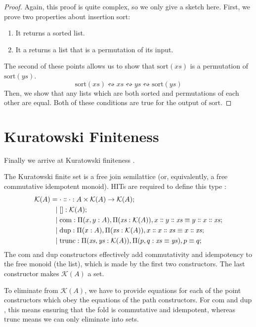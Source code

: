 \begin{proof}
  Again, this proof is quite complex, so we only give a sketch here.
  First, we prove two properties about insertion sort:
  \begin{enumerate}
    \item It returns a sorted list.
    \item It a returns a list that is a permutation of its input.
  \end{enumerate}
  The second of these points allows us to show that \(\text{sort}(\mathit{xs})\)
  is a permutation of \(\text{sort}(\mathit{ys})\).
  \begin{equation}
    \text{sort}(\mathit{xs}) \leftrightsquigarrow \mathit{xs} \leftrightsquigarrow \mathit{ys} \leftrightsquigarrow \text{sort}(\mathit{ys})
  \end{equation}
  Then, we show that any lists which are both sorted and permutations of each
  other are equal.
  Both of these conditions are true for the output of \(\text{sort}\).
\end{proof}
\section{Kuratowski Finiteness} \label{kuratowski}
Finally we arrive at Kuratowski finiteness
\cite{kuratowskiNotionEnsembleFini1920}.
\begin{rm-definition}
  The Kuratowski finite set is a free join semilattice (or, equivalently, a free
  commutative idempotent monoid).
  HITs are required to define this type
  \cite{altenkirchDefinableQuotientsType2011}:
  \begin{equation}
    \begin{aligned}
      \mathcal{K}(A) =&
       \; \cdot \dblcolon \cdot : A \times \mathcal{K}(A) \rightarrow \mathcal{K}(A) ; \\
      \vert& \; [] : \mathcal{K}(A) ; \\
      \vert& \; \text{com} : \Pi (x, y: A) , \Pi (\mathit{xs}: \mathcal{K}(A)) , x \dblcolon y \dblcolon \mathit{xs} \equiv y \dblcolon x \dblcolon \mathit{xs} ; \\
      \vert& \; \text{dup} : \Pi (\mathit{x}: A) , \Pi (\mathit{xs}: \mathcal{K}(A)) , x \dblcolon x \dblcolon \mathit{xs} \equiv x \dblcolon \mathit{xs} ; \\
      \vert& \; \text{trunc} : \Pi (\mathit{xs}, \mathit{ys}: \mathcal{K}(A)) , \Pi (p, q : \mathit{xs} \equiv \mathit{ys}) , p \equiv q ;
    \end{aligned}
  \end{equation}
  The \(\text{com}\) and \(\text{dup}\) constructors effectively add
  commutativity and idempotency to the free monoid (the list), which is made by
  the first two constructors.
  The last constructor makes \(\mathcal{K}(A)\) a set.

  To eliminate from \(\mathcal{K}(A)\), we have to provide equations for each of
  the point constructors which obey the equations of the path constructors.
  For \(\text{com}\) and \(\text{dup}\), this means ensuring that the fold is
  commutative and idempotent, whereas \(\text{trunc}\) means we can only
  eliminate into sets.
\end{rm-definition}

